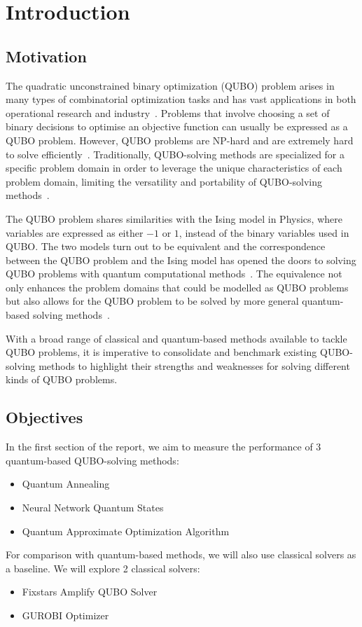 
\chapter{Introduction}
\vspace{2em}

\section{Motivation}
The quadratic unconstrained binary optimization (QUBO) problem arises in many types of combinatorial optimization tasks and has vast applications in both operational research and industry~\cite{b1}. Problems that involve choosing a set of binary decisions to optimise an objective function can usually be expressed as a QUBO problem. However, QUBO problems are NP-hard and are extremely hard to solve efficiently~\cite{barahona1982computational,b1}. Traditionally, QUBO-solving methods are specialized for a specific problem domain in order to leverage the unique characteristics of each problem domain, limiting the versatility and portability of QUBO-solving methods~\cite{b5}.

The QUBO problem shares similarities with the Ising model in Physics, where variables are expressed as either $-1$ or $1$, instead of the binary variables used in QUBO. The two models turn out to be equivalent and the correspondence between the QUBO problem and the Ising model has opened the doors to solving QUBO problems with quantum computational methods~\cite{b5}. The equivalence not only enhances the problem domains that could be modelled as QUBO problems but also allows for the QUBO problem to be solved by more general quantum-based solving methods~\cite{b5}.

With a broad range of classical and quantum-based methods available to tackle QUBO problems, it is imperative to consolidate and benchmark existing QUBO-solving methods to highlight their strengths and weaknesses for solving different kinds of QUBO problems.

\section{Objectives}
In the first section of the report, we aim to measure the performance of 3 quantum-based QUBO-solving methods:
\begin{itemize}
    \item Quantum Annealing
    \item Neural Network Quantum States
    \item Quantum Approximate Optimization Algorithm
\end{itemize}
For comparison with quantum-based methods, we will also use classical solvers as a baseline. We will explore 2 classical solvers:
\begin{itemize}
    \item Fixstars Amplify QUBO Solver
    \item GUROBI Optimizer
\end{itemize}


